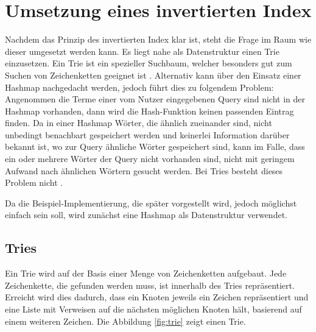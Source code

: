 \section{Umsetzung eines invertierten Index}
Nachdem das Prinzip des invertierten Index klar ist, steht die Frage im Raum wie dieser umgesetzt werden kann.
Es liegt nahe als Datenstruktur einen Trie einzusetzen. Ein Trie ist ein spezieller Suchbaum, welcher besonders gut zum Suchen von Zeichenketten geeignet ist \cite[S. 50 f.]{IR_Intro_Cambridge}.
\newline
Alternativ kann über den Einsatz einer Hashmap nachgedacht werden, jedoch führt dies zu folgendem Problem:
Angenommen die Terme einer vom Nutzer eingegebenen Query sind nicht in der Hashmap vorhanden, dann wird die Hash-Funktion keinen passenden Eintrag finden. Da in einer Hashmap Wörter, die ähnlich zueinander sind, nicht unbedingt benachbart gespeichert werden und keinerlei Information darüber bekannt ist, wo zur Query ähnliche Wörter gespeichert sind, kann im Falle, dass ein oder mehrere Wörter der Query nicht vorhanden sind, nicht mit geringem Aufwand nach ähnlichen Wörtern gesucht werden. Bei Tries besteht dieses Problem nicht \cite[S. 50]{IR_Intro_Cambridge}. 
\newline

Da die Beispiel-Implementierung, die später vorgestellt wird, jedoch möglichst einfach sein soll, wird zunächst eine Hashmap als Datenstruktur verwendet. 

\subsection{Tries}
Ein Trie wird auf der Basis einer Menge von Zeichenketten aufgebaut. Jede Zeichenkette, die gefunden werden muss, ist innerhalb des Tries repräsentiert.
\newline
Erreicht wird dies dadurch, dass ein Knoten jeweils ein Zeichen repräsentiert und eine Liste mit Verweisen auf die nächsten möglichen Knoten hält, basierend auf einem weiteren Zeichen.
Die Abbildung \ref{fig:trie} zeigt einen Trie.

